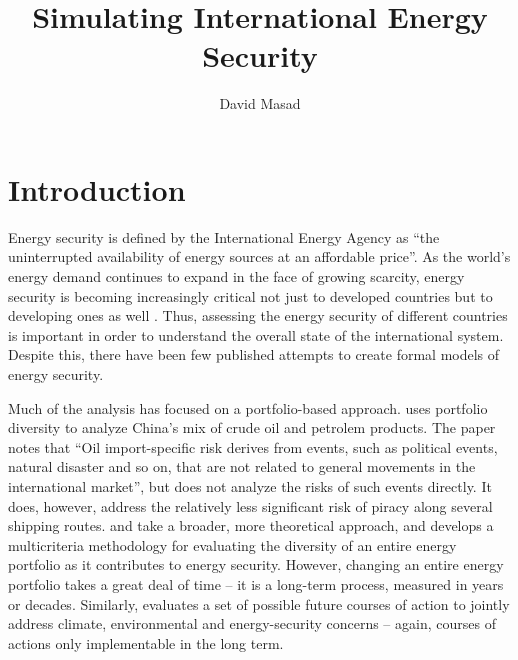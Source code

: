 \documentclass{article}
\begin{document}
\title{Simulating International Energy Security}
	\author{David Masad}
	\maketitle

\section{Introduction}

Energy security is defined by the International Energy Agency as ``the uninterrupted availability of energy sources at an affordable price''\citep{iea_2013}. As the world's energy demand continues to expand in the face of growing scarcity, energy security is becoming increasingly critical not just to developed countries but to developing ones as well \citep{yergin_2006}. Thus, assessing the energy security of different countries is important in order to understand the overall state of the international system. Despite this, there have been few published attempts to create formal models of energy security. 

Much of the analysis has focused on a portfolio-based approach. \citet{wu_2009} uses portfolio diversity to analyze China's mix of crude oil and petrolem products. The paper notes that ``Oil import-specific risk derives from events, such as political events, natural disaster and so on, that are not related to general movements in the international market'', but does not analyze the risks of such events directly. It does, however, address the relatively less significant risk of piracy along several shipping routes. \citet{stirling_2010} and \citet{skea_2010} take a broader, more theoretical approach, and develops a multicriteria methodology for evaluating the diversity of an entire energy portfolio as it contributes to energy security. However, changing an entire energy portfolio takes a great deal of time -- it is a long-term process, measured in years or decades. Similarly, \citet{jacobson_2009} evaluates a set of possible future courses of action to jointly address climate, environmental and energy-security concerns -- again, courses of actions only implementable in the long term.
\end{document}
